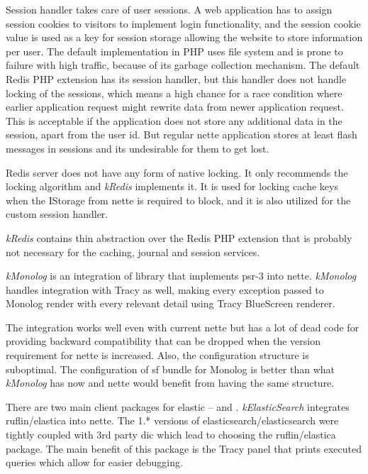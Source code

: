 Session handler takes care of user sessions. A web application has to assign session cookies to visitors to implement login functionality, and the session cookie value is used as a key for session storage allowing the website to store information per user. The default implementation in PHP uses file system and is prone to failure with high traffic, because of its garbage collection mechanism. The default Redis PHP extension has its session handler, but this handler does not handle locking of the sessions, which means a high chance for a race condition where earlier application request might rewrite data from newer application request. This is acceptable if the application does not store any additional data in the session, apart from the user id. But regular \gls{nette} application stores at least flash messages in sessions and its undesirable for them to get lost.

Redis server does not have any form of native locking. It only recommends the locking algorithm  and \textit{\gls{kRedis}} implements it.
It is used for locking cache keys when the IStorage from \gls{nette} is required to block, and it is also utilized for the custom session handler.

\textit{\gls{kRedis}} contains thin abstraction over the Redis PHP extension that is probably not necessary for the caching, journal and session services.

 \label{sec:state:monolog}

\textit{\gls{kMonolog}} is an integration of  library that implements \gls{psr}-3 into \gls{nette}. \textit{\gls{kMonolog}} handles integration with Tracy as well, making every exception passed to Monolog render with every relevant detail using Tracy BlueScreen renderer.

The integration works well even with current \gls{nette} but has a lot of dead code for providing backward compatibility that can be dropped when the version requirement for \gls{nette} is increased. Also, the configuration structure is suboptimal. The configuration of \gls{sf} bundle for Monolog is better than what \textit{\gls{kMonolog}} has now and \gls{nette} would benefit from having the same structure.

 \label{sec:state:elastic-search}

There are two main client packages for \gls{elastic} --  and . \textit{\gls{kElasticSearch}} integrates ruflin/elastica into \gls{nette}. The 1.* versions of elasticsearch/elasticsearch were tightly coupled with 3rd party \gls{dic} which lead to choosing the ruflin/elastica package. The main benefit of this package is the Tracy panel that prints executed queries which allow for easier debugging.

